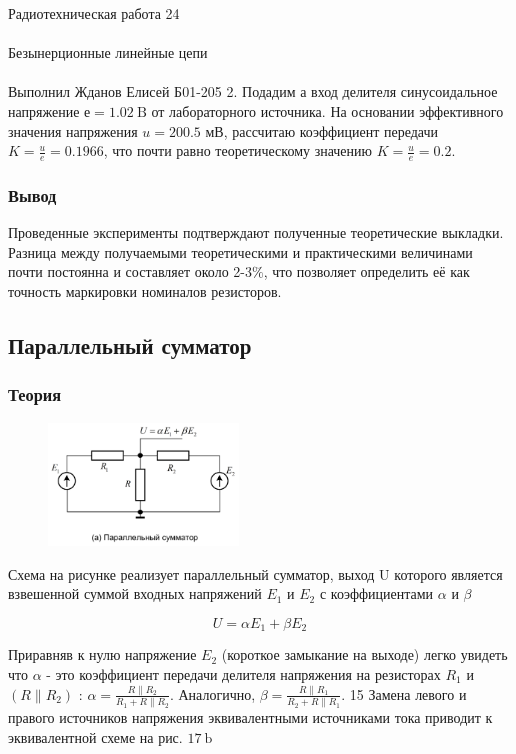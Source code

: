 \documentclass{astroedu-lab}
\begin{document}
\begin{problem}{\huge Радиотехническая работа 24\\\\Безынерционные линейные цепи\\\\Выполнил Жданов Елисей Б01-205}
2. Подадим а вход делителя синусоидальное напряжение $е = 1.02 \mathrm{~B}$ от лабораторного источника. На основании эффективного значения напряжения $u = 200.5 \text{ мВ}$, рассчитаю коэффициент передачи $K=\frac{u}{e} = 0.1966$, что почти равно теоретическому значению $K=\frac{u}{e} = 0.2$.

\subsubsection{Вывод}

Проведенные эксперименты подтверждают полученные теоретические выкладки. Разница между получаемыми теоретическими и практическими величинами почти постоянна и составляет около 2-3$\%$, что позволяет определить её как точность маркировки номиналов резисторов.

\subsection{Параллельный сумматор}

\subsubsection{Теория}

\begin{figure}[!h]
	\centering
	\includegraphics[width=0.45\textwidth]{17a.png}
	\label{fig:boiler}
\end{figure}

Схема на рисунке реализует параллельный сумматор, выход U которого является взвешенной суммой входных напряжений $E_1$ и $E_2$ с коэффициентами $\alpha$ и $\beta$

\begin{equation}
	U = \alpha E_1 + \beta E_2
\end{equation}

Приравняв к нулю напряжение $E_2$ (короткое замыкание на выходе) легко увидеть что $\alpha$ - это коэффициент передачи делителя напряжения на резисторах $R_1$ и $\left(R \| R_2\right)$ : $\alpha=\frac{R \| R_2}{R_1+R \| R_2}$. Аналогично, $\beta=\frac{R \| R_1}{R_2+R \| R_1}$.
15
Замена левого и правого источников напряжения эквивалентными источниками тока приводит к эквивалентной схеме на рис. $17 \mathrm{~b}$


\end{problem}
\end{document}
